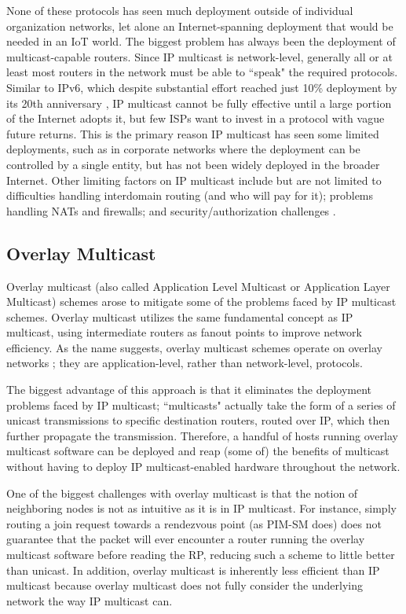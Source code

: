 None of these protocols has seen much deployment outside of individual organization networks, let alone an Internet-spanning deployment that would be needed in an IoT world. The biggest problem has always been the deployment of multicast-capable routers. Since IP multicast is network-level, generally all or at least most routers in the network must be able to ``speak" the required protocols. Similar to IPv6, which despite substantial effort reached just 10\% deployment by its 20th anniversary \cite{ArsTechnica}, IP multicast cannot be fully effective until a large portion of the Internet adopts it, but few ISPs want to invest in a protocol with vague future returns. This is the primary reason IP multicast has seen some limited deployments, such as in corporate networks where the deployment can be controlled by a single entity, but has not been widely deployed in the broader Internet. Other limiting factors on IP multicast include but are not limited to difficulties handling interdomain routing (and who will pay for it); problems handling NATs and firewalls; and security/authorization challenges \cite{MulticastProbs}.

\subsection{Overlay Multicast}
Overlay multicast (also called Application Level Multicast or Application Layer Multicast) schemes arose to mitigate some of the problems faced by IP multicast schemes. Overlay multicast utilizes the same fundamental concept as IP multicast, using intermediate routers as fanout points to improve network efficiency. As the name suggests, overlay multicast schemes operate on overlay networks \cite{overlay}; they are application-level, rather than network-level, protocols. 

The biggest advantage of this approach is that it eliminates the deployment problems faced by IP multicast; ``multicasts" actually take the form of a series of unicast transmissions to specific destination routers, routed over IP, which then further propagate the transmission. Therefore, a handful of hosts running overlay multicast software can be deployed and reap (some of) the benefits of multicast without having to deploy IP multicast-enabled hardware throughout the network.

One of the biggest challenges with overlay multicast is that the notion of neighboring nodes is not as intuitive as it is in IP multicast. For instance, simply routing a join request towards a rendezvous point (as PIM-SM does) does not guarantee that the packet will ever encounter a router running the overlay multicast software before reading the RP, reducing such a scheme to little better than unicast. In addition, overlay multicast is inherently less efficient than IP multicast because overlay multicast does not fully consider the underlying network the way IP multicast can.

